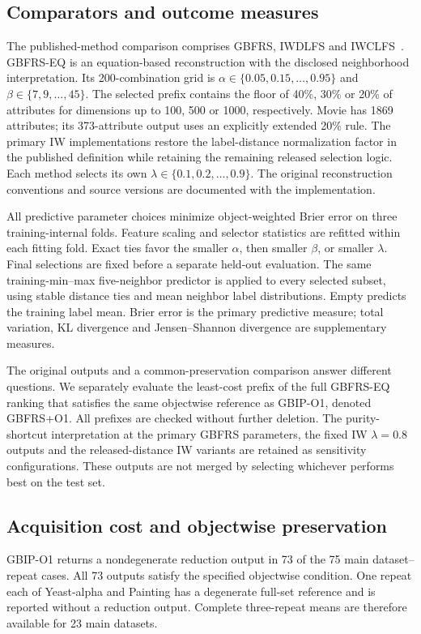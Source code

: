 \subsection{Comparators and outcome measures}
The published-method comparison comprises GBFRS, IWDLFS and IWCLFS~\cite{GBFRS2023,IWNRS2026}. GBFRS-EQ is an equation-based reconstruction with the disclosed neighborhood interpretation. Its 200-combination grid is $\alpha\in\{0.05,0.15,\ldots,0.95\}$ and $\beta\in\{7,9,\ldots,45\}$. The selected prefix contains the floor of 40\%, 30\% or 20\% of attributes for dimensions up to 100, 500 or 1000, respectively. Movie has 1869 attributes; its 373-attribute output uses an explicitly extended 20\% rule. The primary IW implementations restore the label-distance normalization factor in the published definition while retaining the remaining released selection logic. Each method selects its own $\lambda\in\{0.1,0.2,\ldots,0.9\}$. The original reconstruction conventions and source versions are documented with the implementation.

All predictive parameter choices minimize object-weighted Brier error on three training-internal folds. Feature scaling and selector statistics are refitted within each fitting fold. Exact ties favor the smaller $\alpha$, then smaller $\beta$, or smaller $\lambda$. Final selections are fixed before a separate held-out evaluation. The same training-min--max five-neighbor predictor is applied to every selected subset, using stable distance ties and mean neighbor label distributions. Empty predicts the training label mean. Brier error is the primary predictive measure; total variation, KL divergence and Jensen--Shannon divergence are supplementary measures.

The original outputs and a common-preservation comparison answer different questions. We separately evaluate the least-cost prefix of the full GBFRS-EQ ranking that satisfies the same objectwise reference as GBIP-O1, denoted GBFRS+O1. All prefixes are checked without further deletion. The purity-shortcut interpretation at the primary GBFRS parameters, the fixed IW $\lambda=0.8$ outputs and the released-distance IW variants are retained as sensitivity configurations. These outputs are not merged by selecting whichever performs best on the test set.

\subsection{Acquisition cost and objectwise preservation}

GBIP-O1 returns a nondegenerate reduction output in 73 of the 75 main dataset--repeat cases. All 73 outputs satisfy the specified objectwise condition. One repeat each of Yeast-alpha and Painting has a degenerate full-set reference and is reported without a reduction output. Complete three-repeat means are therefore available for 23 main datasets.

